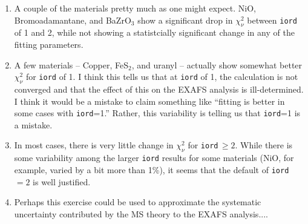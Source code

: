 \documentclass{article}
\begin{document}
\begin{enumerate}
\item A couple of the materials pretty much as one might expect.
  NiO, Bromoadamantane, and BaZrO$_3$ show a significant drop in
  $\chi_\nu^2$ between \texttt{iord} of 1 and 2, while not showing a
  statistcially significant change in any of the fitting parameters.
\item A few materials -- Copper, FeS$_2$, and uranyl -- actually show
  somewhat better $\chi_\nu^2$ for \texttt{iord} of 1.  I think this
  tells us that at \texttt{iord} of 1, the calculation is not
  converged and that the effect of this on the EXAFS analysis is
  ill-determined.  I think it would be a mistake to claim something
  like ``fitting is better in some cases with \texttt{iord}=1.''
  Rather, this variability is telling us that \texttt{iord}=1 is a
  mistake.
\item In most cases, there is very little change in $\chi_\nu^2$ for
  \texttt{iord}\,$\ge2$.  While there is some variability among the
  larger \texttt{iord} results for some materials (NiO, for example,
  varied by a bit more than 1\%), it seems that the default of
  \texttt{iord}\,$=2$ is well justified.
\item Perhaps this exercise could be used to approximate the
  systematic uncertainty contributed by the MS theory to the EXAFS
  analysis....
\end{enumerate}
\end{document}
